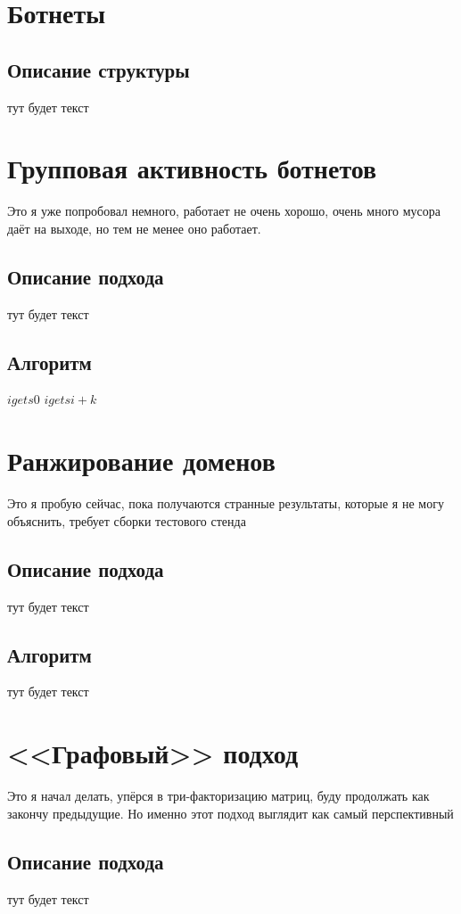 \documentclass[14pt]{extreport}
\begin{document}
	\chapter{Ботнеты}
	\section{Описание структуры}
	тут будет текст
	
	\chapter{Групповая активность ботнетов}
	Это я уже попробовал немного, работает не очень хорошо, очень много мусора даёт на выходе, но тем не менее оно работает.
	\section{Описание подхода}
	тут будет текст
	\section{Алгоритм}

\begin{algorithmic}
    \State $igets 0$
\Else
        \State $igets i+k$
    \EndIf
\EndIf
\end{algorithmic}
	
	\chapter{Ранжирование доменов}
	Это я пробую сейчас, пока получаются странные результаты, которые я не могу объяснить, требует сборки тестового стенда
	\section{Описание подхода}
	тут будет текст
	\section{Алгоритм}
	тут будет текст

	\chapter{<<Графовый>> подход}
	Это я начал делать, упёрся в три-факторизацию матриц, буду продолжать как закончу предыдущие. Но именно этот подход выглядит как самый перспективный
	\section{Описание подхода}
	тут будет текст
\end{document}
